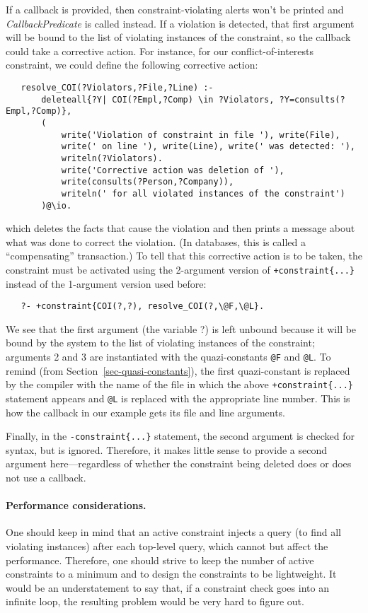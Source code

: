 If a callback is provided, then constraint-violating alerts won't be
printed and \textit{CallbackPredicate} is called instead. 
If a violation is detected,
that first argument will be bound to the list of
violating instances of the constraint, so the callback could take a
corrective action. For instance, for our conflict-of-interests constraint, we could
define the following corrective action:
\begin{verbatim}
   resolve_COI(?Violators,?File,?Line) :-
       deleteall{?Y| COI(?Empl,?Comp) \in ?Violators, ?Y=consults(?Empl,?Comp)},
       (
           write('Violation of constraint in file '), write(File),
           write(' on line '), write(Line), write(' was detected: '),
           writeln(?Violators).
           write('Corrective action was deletion of '),
           write(consults(?Person,?Company)),
           writeln(' for all violated instances of the constraint')
       )@\io.
\end{verbatim}
which deletes the facts that cause the violation and then
prints a message about what was done to correct the violation. (In
databases, this is called a ``compensating'' transaction.)
To tell \ERGO that this corrective action is to be taken, the constraint
must be activated using the 2-argument version of
\texttt{+constraint\{...\}}  
instead of the 1-argument version used before:
\begin{verbatim}
   ?- +constraint{COI(?,?), resolve_COI(?,\@F,\@L}.
\end{verbatim}
We see that the first argument (the variable ?) is left unbound because it will be bound
by the system to the list of violating instances of the constraint; arguments 2
and 3 are instantiated with the quazi-constants \texttt{\bs{}@F} and
\texttt{\bs{}@L}. To remind (from Section~\ref{sec-quasi-constants}),
the first quazi-constant is replaced by the
compiler with the name of the file in which the above
\texttt{+constraint\{...\}} statement appears and \texttt{\bs{}@L} is
replaced with the appropriate line number. This is how the callback
in our example gets its file and line arguments.

Finally, in the \texttt{-constraint\{...\}} statement, the second argument
is checked for syntax, but is ignored. Therefore,
it makes little sense to provide a second argument here---regardless of whether the constraint being deleted does or does not use a
callback.

\paragraph{Performance considerations.}
One should keep in mind that an active constraint injects a query (to find
all violating instances) after each top-level query, which cannot but
affect the performance. Therefore, one should strive to keep the number of
active constraints to a minimum and to design the constraints to be
lightweight. It would be an understatement to say that,
if a constraint check goes into an
infinite loop, the resulting problem would be very hard to figure out.



